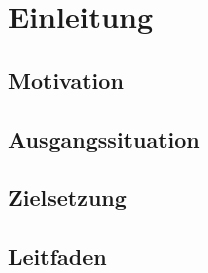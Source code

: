 \chapter{Einleitung}

\section{Motivation}

\section{Ausgangssituation}

\section{Zielsetzung}

\section{Leitfaden}